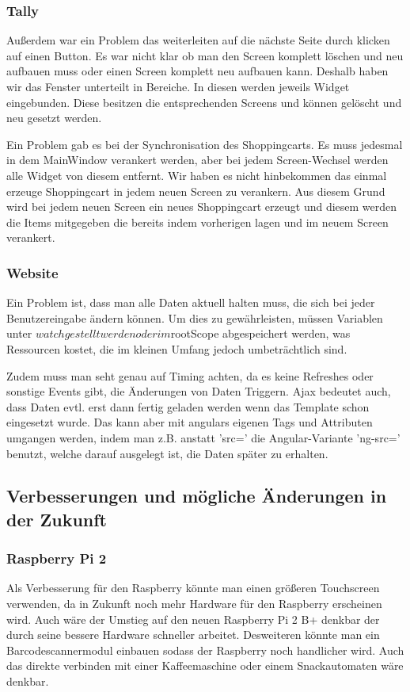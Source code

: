 \documentclass[11pt,a4paper]{article} %
\begin{document}
\subsubsection{Tally}
Außerdem war ein Problem das weiterleiten auf die nächste Seite durch klicken auf einen Button. Es war nicht klar ob man den Screen komplett löschen und neu aufbauen muss oder einen Screen komplett neu aufbauen kann. Deshalb haben wir das Fenster unterteilt in Bereiche. In diesen werden jeweils Widget eingebunden. Diese besitzen die entsprechenden Screens und können gelöscht und neu gesetzt werden.
\par
Ein Problem gab es bei der Synchronisation des Shoppingcarts. Es muss jedesmal in dem MainWindow verankert werden, aber bei jedem Screen-Wechsel werden alle Widget von diesem entfernt. Wir haben es nicht hinbekommen das einmal erzeuge Shoppingcart in jedem neuen Screen zu verankern. Aus diesem Grund wird bei jedem neuen  Screen ein neues Shoppingcart erzeugt und diesem werden die Items mitgegeben die bereits indem vorherigen  lagen und im neuem Screen verankert.

\subsubsection{Website}
Ein Problem ist, dass man alle Daten aktuell halten muss, die sich bei jeder Benutzereingabe ändern können.
Um dies zu gewährleisten, müssen Variablen unter $watch gestellt werden oder im $rootScope abgespeichert werden, was Ressourcen kostet, die im kleinen Umfang jedoch umbeträchtlich sind.
\par
Zudem muss man seht genau auf Timing achten, da es keine Refreshes oder sonstige Events gibt, die Änderungen von Daten Triggern. Ajax bedeutet auch, dass Daten evtl. erst dann fertig geladen werden wenn das Template schon eingesetzt wurde. Das kann aber mit angulars eigenen Tags und Attributen umgangen werden, indem man z.B. anstatt 'src=' die Angular-Variante 'ng-src=' benutzt, welche darauf ausgelegt ist, die Daten später zu erhalten.

\subsection{Verbesserungen und mögliche Änderungen in der Zukunft}

\subsubsection{Raspberry Pi 2}
Als Verbesserung für den Raspberry könnte man einen größeren Touchscreen verwenden, da in Zukunft noch mehr Hardware für den Raspberry erscheinen wird. Auch wäre der Umstieg auf den neuen Raspberry Pi 2 B+ denkbar der durch seine bessere Hardware schneller arbeitet. Desweiteren könnte man ein Barcodescannermodul einbauen sodass der Raspberry noch handlicher wird. Auch das direkte verbinden mit einer Kaffeemaschine oder einem Snackautomaten wäre denkbar.
\end{document}
